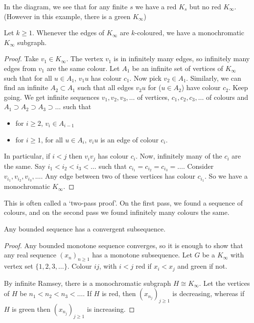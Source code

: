 \documentclass{article}
\newcommand{\red}[1]{\textcolor{bred}{#1}}
\newcommand{\green}[1]{\textcolor{bgreen}{#1}}
\begin{document}
In the diagram, we see that for any finite $s$ we have a \red{red $K_s$} but no \red{red $K_\infty$}.
(However in this example, there is a \green{green $K_\infty$})

\begin{nthm}\label{thm:infRamsey}
    Let $k \geq 1$. Whenever the edges of \hyperlink{def:kInf}{$K_\infty$} are $k$-coloured, we have a monochromatic $K_\infty$ subgraph.
\end{nthm}

\begin{proof}
    Take $v_1 \in K_\infty$.  The vertex $v_1$ is in infinitely many edges, so infinitely many edges from $v_1$ are the same colour.
    Let $A_1$ be an infinite set of vertices of $K_\infty$ such that for all $u \in A_1$, $v_1 u$ has colour $c_1$.
    Now pick $v_2 \in A_1$. Similarly, we can find an infinite $A_2 \subset A_1$ such that all edges $v_2 u$ for ($u \in A_2$) have colour $c_2$.
    Keep going. We get infinite sequences $v_1, v_2, v_3, \dotsc$ of vertices, $c_1, c_2, c_3, \dotsc$ of colours and $A_1 \supset A_2 \supset A_3 \supset \dots$ such that
    \begin{itemize}
        \item for $i \geq 2$, $v_i \in A_{i-1}$
        \item for $i \geq 1$, for all $u \in A_i$, $v_i u$ is an edge of colour $c_i$.
    \end{itemize}
    In particular, if $i < j$ then $v_i v_j$ has colour $c_i$. Now, infinitely many of the $c_i$ are the same.
    Say $i_1 < i_2 < i_3 < \dots$ such that $c_{i_1} = c_{i_2} = c_{i_3} = \dotsc$.
    Consider $v_{i_1}, v_{i_2}, v_{i_3}, \dotsc$. Any edge between two of these vertices has colour $c_{i_1}$. So we have a monochromatic $K_\infty$.
\end{proof}

\begin{remark}
    This is often called a `two-pass proof'. On the first pass, we found a sequence of colours, and on the second pass we found infinitely many colours the same.
\end{remark}

\begin{ncor}
    Any bounded sequence has a convergent subsequence.
\end{ncor}

\begin{proof}
    Any bounded monotone sequence converges, so it is enough to show that any real sequence $(x_n)_{n \geq 1}$ has a monotone subsequence.
    Let $G$ be a $K_\infty$ with vertex set $\{1, 2, 3, \dotsc\}$. Colour $ij$, with $i<j$ \red{red} if $x_i < x_j$ and \green{green} if not.

    By infinite Ramsey, there is a monochromatic subgraph $H \cong K_\infty$. Let the vertices of $H$ be $n_1 < n_2 < n_3 < \dots$.
    If $H$ is \red{red}, then $(x_{n_j})_{j \geq 1}$ is decreasing, whereas if $H$ is \green{green} then $(x_{n_j})_{j \geq 1}$ is increasing.
\end{proof}
\end{document}
